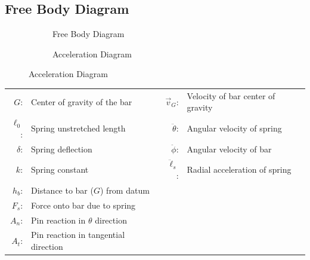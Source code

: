 \documentclass[12pt]{report}
\begin{document}
\begin{flushleft}
\section{Free Body Diagram}
\begin{figure}[!htp]
  \caption{Acceleration and Free Body Diagrams}
   \begin{minipage}[c]{.5\textwidth}
     \begin{subfigure}{\textwidth}
       \center
      
      \vspace{1ex}
      \caption{Free Body Diagram}
      \label{fbd}
      \end{subfigure}
   \end{minipage}%
   \begin{minipage}[c]{.5\textwidth}
     \begin{subfigure}{\textwidth}
       \center
       \vspace{3ex}
       
       \vspace{2ex}
       \caption{Acceleration Diagram}
       \label{ad}
    \end{subfigure}
   \end{minipage}
\end{figure}
\vspace{-2ex}
\begin{tabular}{rl@{\hskip .5in}rl}
  $G$:&Center of gravity of the bar &$\vec{v}_G$:& Velocity of bar center of gravity\\
  $\ell_0$:& Spring unstretched length  &$\ddot{\theta}$:& Angular velocity of spring \\
  $\delta$:& Spring deflection &$\ddot{\phi}$:& Angular velocity of bar\\
  $k$:& Spring constant &$\ddot{\ell}_s$:& Radial acceleration of spring \\
  $h_{b}$:& Distance to bar ($G$) from datum \\
  $F_s$:& Force onto bar due to spring\\
  $A_{n}$:& Pin reaction in $\theta$ direction\\
  $A_{t}$:& Pin reaction in tangential direction \\
\end{tabular}


\end{flushleft}
\end{document}
